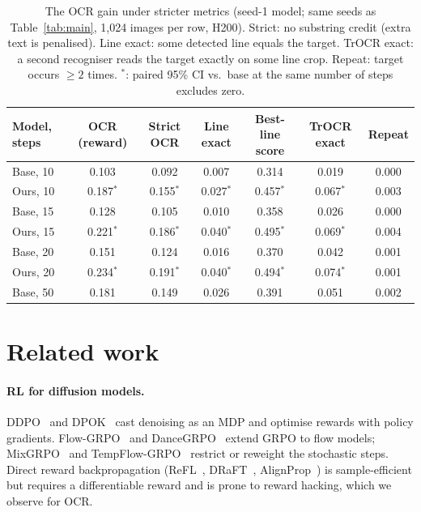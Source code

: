 \documentclass{article}
\newcommand{\sig}{$^{*}$}
\begin{document}
\begin{table}[t]
  \caption{The OCR gain under stricter metrics (seed-1 model; same seeds as Table~\ref{tab:main}, 1{,}024 images per row, H200). Strict: no
  substring credit (extra text is penalised). Line exact: some detected line equals the target. TrOCR exact: a second
  recogniser reads the target exactly on some line crop. Repeat: target occurs $\ge2$ times. $^{*}$: paired 95\% CI vs.\ base at
  the same number of steps excludes zero.}
  \label{tab:robust}
  \centering
  \small
  \setlength{\tabcolsep}{4pt}
  \begin{tabular}{lcccccc}
    \toprule
    Model, steps & OCR (reward) & Strict OCR & Line exact & Best-line score & TrOCR exact & Repeat \\
    \midrule
    Base, 10   & 0.103 & 0.092 & 0.007 & 0.314 & 0.019 & 0.000 \\
    Ours, 10   & 0.187\sig & 0.155\sig & 0.027\sig & 0.457\sig & 0.067\sig & 0.003 \\
    Base, 15   & 0.128 & 0.105 & 0.010 & 0.358 & 0.026 & 0.000 \\
    Ours, 15   & 0.221\sig & 0.186\sig & 0.040\sig & 0.495\sig & 0.069\sig & 0.004 \\
    Base, 20   & 0.151 & 0.124 & 0.016 & 0.370 & 0.042 & 0.001 \\
    Ours, 20   & 0.234\sig & 0.191\sig & 0.040\sig & 0.494\sig & 0.074\sig & 0.001 \\
    Base, 50   & 0.181 & 0.149 & 0.026 & 0.391 & 0.051 & 0.002 \\
    \bottomrule
  \end{tabular}
\end{table}

\section{Related work}
\label{sec:related}

\paragraph{RL for diffusion models.} DDPO~\citep{black2023ddpo} and DPOK~\citep{fan2023dpok} cast denoising as an MDP and
optimise rewards with policy gradients. Flow-GRPO~\citep{liu2025flowgrpo} and DanceGRPO~\citep{xue2025dancegrpo} extend GRPO
\citep{shao2024deepseekmath} to flow models; MixGRPO~\citep{li2025mixgrpo} and TempFlow-GRPO~\citep{he2025tempflowgrpo}
restrict or reweight the stochastic steps. Direct reward backpropagation (ReFL~\citep{xu2023imagereward},
DRaFT~\citep{clark2024draft}, AlignProp~\citep{prabhudesai2023alignprop}) is sample-efficient but requires a differentiable
reward and is prone to reward hacking, which we observe for OCR.
\end{document}
